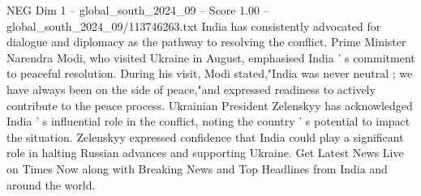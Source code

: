 \begin{textsample}{NEG Dim 1 – global\_south\_2024\_09 – Score 1.00 – global\_south\_2024\_09/113746263.txt}
India has consistently advocated for dialogue and diplomacy as the pathway to resolving the conflict.
Prime Minister Narendra Modi, who visited Ukraine in August, emphasised India ' s commitment to peaceful resolution.
During his visit, Modi stated,"India was never neutral ; we have always been on the side of peace,"and expressed readiness to actively contribute to the peace process.
Ukrainian President Zelenskyy has acknowledged India ' s influential role in the conflict, noting the country ' s potential to impact the situation.
Zelenskyy expressed confidence that India could play a significant role in halting Russian advances and supporting Ukraine.
Get Latest News Live on Times Now along with Breaking News and Top Headlines from India and around the world.

\end{textsample}
